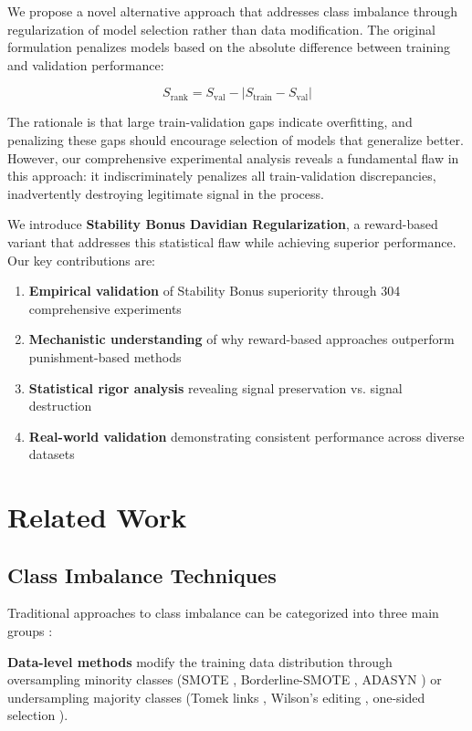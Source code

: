\documentclass[twoside,11pt]{article}
\begin{document}
We propose a novel alternative approach that addresses class imbalance through regularization of model selection rather than data modification. The original formulation penalizes models based on the absolute difference between training and validation performance:

\begin{equation}
S_{\text{rank}} = S_{\text{val}} - |S_{\text{train}} - S_{\text{val}}|
\end{equation}

The rationale is that large train-validation gaps indicate overfitting, and penalizing these gaps should encourage selection of models that generalize better. However, our comprehensive experimental analysis reveals a fundamental flaw in this approach: it indiscriminately penalizes all train-validation discrepancies, inadvertently destroying legitimate signal in the process.

We introduce \textbf{Stability Bonus Davidian Regularization}, a reward-based variant that addresses this statistical flaw while achieving superior performance. Our key contributions are:

\begin{enumerate}
    \item \textbf{Empirical validation} of Stability Bonus superiority through 304 comprehensive experiments
    \item \textbf{Mechanistic understanding} of why reward-based approaches outperform punishment-based methods
    \item \textbf{Statistical rigor analysis} revealing signal preservation vs. signal destruction
    \item \textbf{Real-world validation} demonstrating consistent performance across diverse datasets
\end{enumerate}

\section{Related Work}

\subsection{Class Imbalance Techniques}
Traditional approaches to class imbalance can be categorized into three main groups \citep{fernandez2018learning,haixiang2017learning}:

\textbf{Data-level methods} modify the training data distribution through oversampling minority classes (SMOTE \citep{chawla2002smote}, Borderline-SMOTE \citep{han2005borderline}, ADASYN \citep{he2008adasyn}) or undersampling majority classes (Tomek links \citep{tomek1976two}, Wilson's editing \citep{wilson1972asymptotic}, one-sided selection \citep{kubat1997addressing}).
\end{document}
